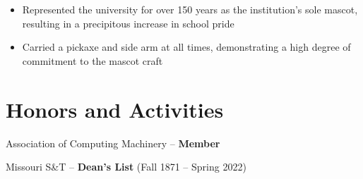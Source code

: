 \documentclass{article}
\newenvironment{ul}{
    \begin{itemize}[topsep=\parskip, partopsep=\parskip]
    \itemsep-.12em
    \let\olditem\item
    \renewcommand\item{\olditem}
}{
    \vspace{.45em}
    \end{itemize}
}
\begin{document}
\begin{ul}
    \item{Represented the university for over 150 years as the institution's sole mascot, resulting in a precipitous increase in school pride}
    \item{Carried a pickaxe and side arm at all times, demonstrating a high degree of commitment to the mascot craft}
\end{ul}

\vspace{-.4em}

\section{Honors and Activities}

Association of Computing Machinery -- \textbf{Member}

Missouri S\&T -- \textbf{Dean's List} (Fall 1871 -- Spring 2022)
\end{document}
